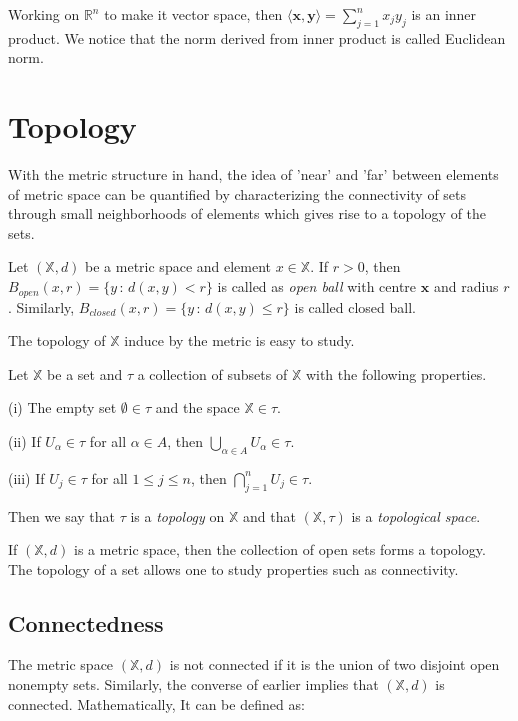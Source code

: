 Working on ${\mathbb R}^{n}$ to make it vector space, then 
$\langle{\mathbf x},{\mathbf y}\rangle=\sum_{j=1}^{n}x_{j}y_{j}$
is an inner product. We notice that the norm derived from inner product is called Euclidean norm.

\section{Topology}

With the metric structure in hand, the idea of 'near' and 'far' between elements of metric space can be quantified by characterizing the connectivity
of sets through small neighborhoods of elements which gives rise to a topology of the sets.

\begin{definition}
Let $(\mathbb{X},d)$ be a metric space and element $x \in \mathbb{X}$. If $r>0$, then $B_{open}(x,r)=\{y\,:\,d(x,y)<r\}$ is called as \emph{open ball} 
with centre ${\mathbf x}$ and radius $r$. Similarly, $B_{closed}(x,r)=\{y\,:\,d(x,y)\leq r\}$ is called closed ball.
\end{definition}

The topology of $\mathbb{X}$ induce by the
metric is easy to study. 

\begin{definition}\label{topology}
Let $\mathbb{X}$ be a set and $\tau$ a collection of subsets of $\mathbb{X}$ 
with the following properties.

(i) The empty set $\emptyset\in \tau$ and the space $\mathbb{X}\in\tau$.

(ii) If $U_{\alpha}\in\tau$ for all $\alpha\in A$, then
$\bigcup_{\alpha\in A} U_{\alpha}\in\tau$.

(iii) If $U_{j}\in\tau$ for all $1\leq j\leq n$, then
$\bigcap_{j=1}^{n} U_{j}\in\tau$.

Then we say that $\tau$ is a \emph{topology} on $\mathbb{X}$ and
that $(\mathbb{X},\tau)$ is a \emph{topological space}. 
\end{definition}

If $(\mathbb{X},d)$ is a metric space, then the collection of open sets forms a topology. The topology of a set allows one to study properties such as connectivity.

\subsection{Connectedness}

The metric space $(\mathbb{X}, d)$ is not connected if it is the union of two disjoint open nonempty sets. Similarly, the converse of earlier implies that $(\mathbb{X}, d)$ is connected. Mathematically, It can be defined as:

